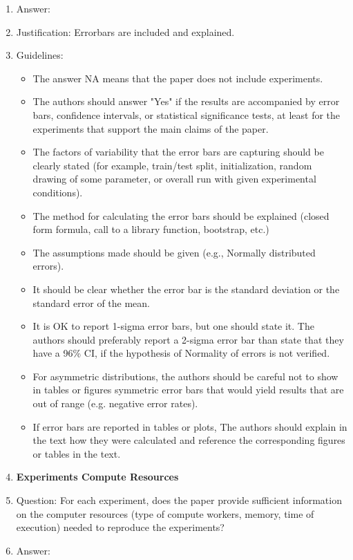 \documentclass{article}
\begin{document}
\begin{enumerate}
    \item[] Answer: \answerYes{}
    \item[] Justification: Errorbars are included and explained.
    \item[] Guidelines:
    \begin{itemize}
        \item The answer NA means that the paper does not include experiments.
        \item The authors should answer "Yes" if the results are accompanied by error bars, confidence intervals, or statistical significance tests, at least for the experiments that support the main claims of the paper.
        \item The factors of variability that the error bars are capturing should be clearly stated (for example, train/test split, initialization, random drawing of some parameter, or overall run with given experimental conditions).
        \item The method for calculating the error bars should be explained (closed form formula, call to a library function, bootstrap, etc.)
        \item The assumptions made should be given (e.g., Normally distributed errors).
        \item It should be clear whether the error bar is the standard deviation or the standard error of the mean.
        \item It is OK to report 1-sigma error bars, but one should state it. The authors should preferably report a 2-sigma error bar than state that they have a 96\% CI, if the hypothesis of Normality of errors is not verified.
        \item For asymmetric distributions, the authors should be careful not to show in tables or figures symmetric error bars that would yield results that are out of range (e.g. negative error rates).
        \item If error bars are reported in tables or plots, The authors should explain in the text how they were calculated and reference the corresponding figures or tables in the text.
    \end{itemize}
\item {\bf Experiments Compute Resources}
    \item[] Question: For each experiment, does the paper provide sufficient information on the computer resources (type of compute workers, memory, time of execution) needed to reproduce the experiments?
    \item[] Answer: \answerYes{}

\end{enumerate}
\end{document}
